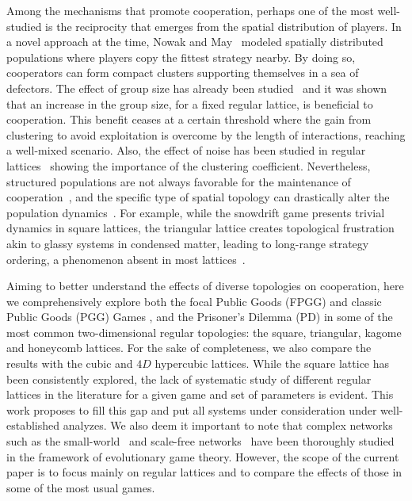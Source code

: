 \documentclass[5p,review]{elsarticle}
\begin{document}
Among the mechanisms that promote cooperation, perhaps one of the most well-studied is the reciprocity that emerges from the spatial distribution of players. In a novel approach at the time, Nowak and May~\cite{Nowak1992a} modeled spatially distributed populations where players copy the fittest strategy nearby. By doing so, cooperators can form compact clusters supporting themselves in a sea of defectors.
%
The effect of group size has already been studied~\cite{Wang2012a, Szolnoki2011,Szabo2009} and it was shown that an increase in the group size, for a fixed regular lattice, is beneficial to cooperation.
%
This benefit ceases at a certain threshold where the gain from clustering to avoid exploitation is overcome by the length of interactions, reaching a well-mixed scenario.
%
Also, the effect of noise has been studied in regular lattices~\cite{perc2013evolutionary} showing the importance of the clustering coefficient.
%
Nevertheless,  structured populations are not always favorable for the maintenance of cooperation~\cite{ Hauert2004,gracia-lazaro_pnas12}, and the specific type of spatial topology can drastically alter the population dynamics~\cite{santos_prsb06}. For example, while the snowdrift game presents trivial dynamics in square lattices, the triangular lattice creates topological frustration akin to glassy systems in condensed matter, leading to long-range strategy ordering, a phenomenon absent in most lattices~\cite{Amaral2017}.


Aiming to better understand the effects of diverse {top\-o\-lo\-gies} on cooperation, here we comprehensively explore both the focal Public Goods (FPGG) and classic Public Goods (PGG) Games , and the Prisoner's Dilemma (PD) in some of the most common two-dimensional regular {top\-o\-lo\-gies}: the square, triangular, kagome and honeycomb lattices. For the sake of completeness, we also compare the results with the cubic and $4D$ hypercubic lattices. 
%
While the square lattice has been consistently explored, the lack of systematic study of different regular lattices in the literature for a given game and set of parameters is evident. This work proposes to fill this gap and put all systems under consideration under well-established analyzes.  We also deem it important to note that complex networks such as the small-world~\cite{watts_dj_n98} and scale-free networks~\cite{Barabasi1999} have been thoroughly studied in the framework of evolutionary game theory. However, the scope of the current paper is to focus mainly on regular lattices and to compare the effects of those in some of the most usual games.
%
\end{document}
